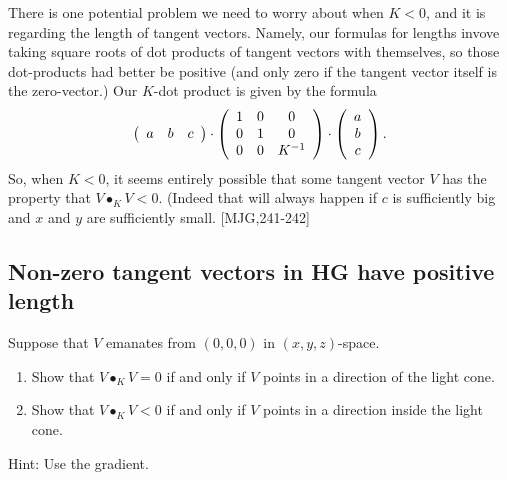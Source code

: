 \documentclass{ximera}
\begin{document}
There is one potential problem we need to worry about when $K<0$, and it is
regarding the length of tangent vectors. Namely, our formulas for lengths
invove taking square roots of dot products of tangent vectors with themselves,
so those dot-products had better be positive (and only zero if the tangent
vector itself is the zero-vector.) Our $K$-dot product is given by the formula%
\[
\left(
\begin{array}
[c]{ccc}%
a & b & c
\end{array}
\right)  \cdot\left(
\begin{array}
[c]{ccc}%
1 & 0 & 0\\
0 & 1 & 0\\
0 & 0 & K^{-1}%
\end{array}
\right)  \cdot\left(
\begin{array}
[c]{c}%
a\\
b\\
c
\end{array}
\right)  .
\]
So, when $K<0$, it seems entirely possible that some tangent vector $V$ has
the property that $V\bullet_{K}V<0$. (Indeed that will always happen if $c$ is
sufficiently big and $x$ and $y$ are sufficiently small.
[MJG,241-242]

\subsection*{Non-zero tangent vectors in \textbf{HG} have positive length}

\begin{exercise}
Suppose that $V$ emanates from $\left(  0,0,0\right)  $ in $\left(
x,y,z\right)  $-space.
\begin{enumerate}
\item Show that $V\bullet_{K}V=0$ if and only if $V$ points in a direction of the
light cone.

\item Show that $V\bullet_{K}V<0$ if and only if $V$ points in a direction inside
the light cone.

\end{enumerate}
Hint: Use the gradient. 
\end{exercise}
\end{document}

